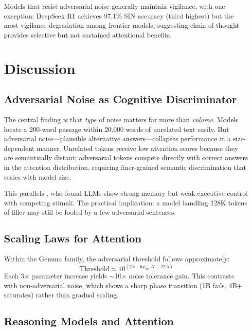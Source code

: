 \documentclass[11pt,twocolumn]{article}
\begin{document}
Models that resist adversarial noise generally maintain vigilance, with one exception: DeepSeek R1 achieves 97.1\% SIN accuracy (third highest) but the most vigilance degradation among frontier models, suggesting chain-of-thought provides selective but not sustained attentional benefits.

\section{Discussion}

\subsection{Adversarial Noise as Cognitive Discriminator}

The central finding is that \emph{type} of noise matters far more than \emph{volume}. Models locate a 200-word passage within 20,000 words of unrelated text easily. But adversarial noise---plausible alternative answers---collapses performance in a size-dependent manner. Unrelated tokens receive low attention scores because they are semantically distant; adversarial tokens compete directly with correct answers in the attention distribution, requiring finer-grained semantic discrimination that scales with model size.

This parallels \citet{delangis2025strong}, who found LLMs show strong memory but weak executive control with competing stimuli. The practical implication: a model handling 128K tokens of filler may still be fooled by a few adversarial sentences.

\subsection{Scaling Laws for Attention}

Within the Gemma family, the adversarial threshold follows approximately:
\begin{equation}
  \text{Threshold} \approx 10^{(2.5 \cdot \log_{10} N - 22.5)}
\end{equation}
Each 3$\times$ parameter increase yields $\sim$10$\times$ noise tolerance gain. This contrasts with non-adversarial noise, which shows a sharp phase transition (1B fails, 4B+ saturates) rather than gradual scaling.

\subsection{Reasoning Models and Attention}
\end{document}
